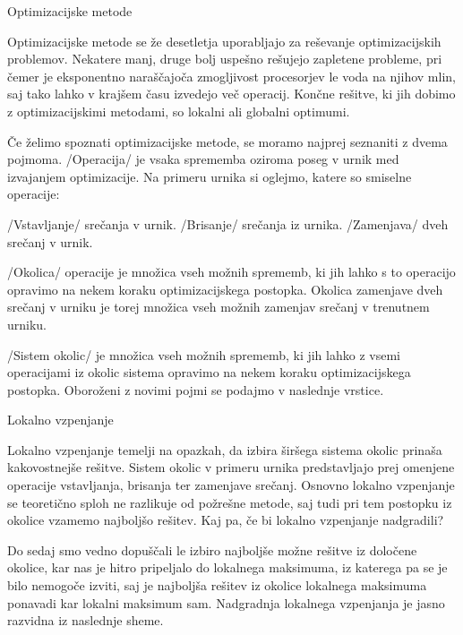\documentclass[a4paper,10pt]{article}
\begin{document}
Optimizacijske metode %

Optimizacijske metode se že desetletja uporabljajo za reševanje optimizacijskih problemov.
Nekatere manj, druge bolj uspešno rešujejo zapletene probleme, pri čemer je eksponentno
naraščajoča zmogljivost procesorjev le voda na njihov mlin, saj tako lahko v krajšem
času izvedejo več operacij. Končne rešitve, ki jih dobimo z optimizacijskimi metodami,
so lokalni ali globalni optimumi.

Če želimo spoznati optimizacijske metode, se moramo najprej seznaniti z dvema pojmoma.
/Operacija/ je vsaka sprememba oziroma poseg v urnik med izvajanjem optimizacije.
Na primeru urnika si oglejmo, katere so smiselne operacije:

   /Vstavljanje/ srečanja v urnik.
   /Brisanje/ srečanja iz urnika.
   /Zamenjava/ dveh srečanj v urnik.

/Okolica/ operacije je množica vseh možnih sprememb, ki jih lahko s to operacijo
opravimo na nekem koraku optimizacijskega postopka. Okolica zamenjave dveh srečanj v urniku
je torej množica vseh možnih zamenjav srečanj v trenutnem urniku.

/Sistem okolic/ je množica vseh možnih sprememb, ki jih lahko z vsemi operacijami iz
okolic sistema opravimo na nekem koraku optimizacijskega postopka. Oboroženi z novimi pojmi
se podajmo v naslednje vrstice.

Lokalno vzpenjanje %

Lokalno vzpenjanje temelji na opazkah, da izbira širšega sistema okolic prinaša kakovostnejše
rešitve. Sistem okolic v primeru urnika predstavljajo prej omenjene operacije vstavljanja,
brisanja ter zamenjave srečanj. Osnovno lokalno vzpenjanje se teoretično sploh ne razlikuje
od požrešne metode, saj tudi pri tem postopku iz okolice vzamemo najboljšo rešitev. Kaj pa,
če bi lokalno vzpenjanje nadgradili?

Do sedaj smo vedno dopuščali le izbiro najboljše možne rešitve iz določene okolice, kar nas
je hitro pripeljalo do lokalnega maksimuma, iz katerega pa se je bilo nemogoče izviti, saj
je najboljša rešitev iz okolice lokalnega maksimuma ponavadi kar lokalni maksimum sam.
Nadgradnja lokalnega vzpenjanja je jasno razvidna iz naslednje sheme.
\end{document}
